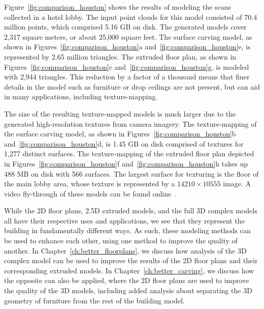 \documentclass[12pt,onecolumn,oneside]{book}
\begin{document}
Figure~\ref{fig:comparison_houston} shows the results of modeling the scans collected in a hotel lobby.  The input point clouds for this model consisted of 70.4 million points, which comprised 5.16 GB on disk.  The generated models cover 2,317 square meters, or about 25,000 square feet.  The surface carving model, as shown in Figures~\ref{fig:comparison_houston}a and~\ref{fig:comparison_houston}e, is represented by 2.65 million triangles.  The extruded floor plan, as shown in Figures~\ref{fig:comparison_houston}c and~\ref{fig:comparison_houston}g, is modeled with 2,944 triangles.  This reduction by a factor of a thousand means that finer details in the model such as furniture or drop ceilings are not present, but can aid in many applications, including texture-mapping.

The size of the resulting texture-mapped models is much larger due to the generated high-resolution textures from camera imagery.  The texture-mapping of the surface carving model, as shown in Figures~\ref{fig:comparison_houston}b and~\ref{fig:comparison_houston}d, is 1.45 GB on disk comprised of textures for 1,277 distinct surfaces.  The texture-mapping of the extruded floor plan depicted in Figures~\ref{fig:comparison_houston}f and~\ref{fig:comparison_houston}h takes up 488 MB on disk with 566 surfaces.  The largest surface for texturing is the floor of the main lobby area, whose texture is represented by a $14210 \times 10555$ image.  A video fly-through of these models can be found online~\cite{video}.

While the 2D floor plans, 2.5D extruded models, and the full 3D complex models all have their respective uses and applications, we see that they represent the building in fundamentally different ways.  As such, these modeling methods can be used to enhance each other, using one method to improve the quality of another.  In Chapter~\ref{ch:better_floorplans}, we discuss how analysis of the 3D complex model can be used to improve the results of the 2D floor plans and their corresponding extruded models.  In Chapter~\ref{ch:better_carving}, we discuss how the opposite can also be applied, where the 2D floor plans are used to improve the quality of the 3D models, including added analysis about separating the 3D geometry of furniture from the rest of the building model.

\end{document}
